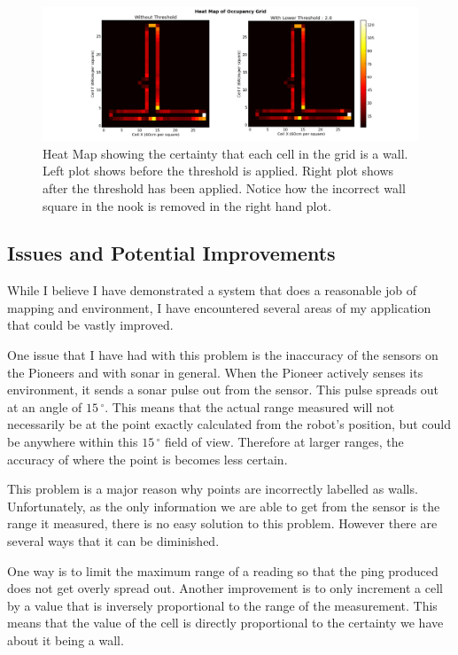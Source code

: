 \documentclass{article}
\begin{document}
\begin{figure}[H]
\centering
\includegraphics[width=1.1\textwidth]{final_example.png}
\caption{Heat Map showing the certainty that each cell in the grid is a wall. Left plot shows before the threshold is applied. Right plot shows after the threshold has been applied. Notice how the incorrect wall square in the nook is removed in the right hand plot.}
\label{fig:final-example}
\end{figure}

\subsection{Issues and Potential Improvements}
\label{sec:issues}
While I believe I have demonstrated a system that does a reasonable job of mapping and environment, I have encountered several areas of my application that could be vastly improved.

One issue that I have had with this problem is the inaccuracy of the sensors on the Pioneers and with sonar in general. When the Pioneer actively senses its environment, it sends a sonar pulse out from the sensor. This pulse spreads out at an angle of $15\,^\circ$. This means that the actual range measured will not necessarily be at the point exactly calculated from the robot's position, but could be anywhere within this $15\,^\circ$ field of view. Therefore at larger ranges, the accuracy of where the point is becomes less certain.

This problem is a major reason why points are incorrectly labelled as walls. Unfortunately, as the only information we are able to get from the sensor is the range it measured, there is no easy solution to this problem. However there are several ways that it can be diminished. 

One way is to limit the maximum range of a reading so that the ping produced does not get overly spread out. Another improvement is to only increment a cell by a value that is inversely proportional to the range of the measurement. This means that the value of the cell is directly proportional to the certainty we have about it being a wall. 
\end{document}
